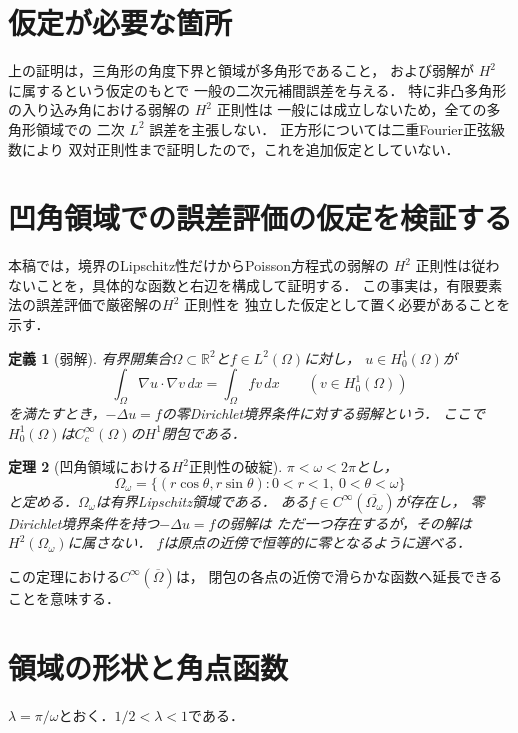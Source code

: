 \documentclass[a5paper,10pt,onecolumn]{jsarticle}
\theoremstyle{mathnotetheorem}
\newtheorem{theorem}{定理}[section]
\newtheorem{definition}[theorem]{定義}
\begin{document}
\section{仮定が必要な箇所}
上の証明は，三角形の角度下界と領域が多角形であること，
および弱解が $H^2$ に属するという仮定のもとで
一般の二次元補間誤差を与える．
特に非凸多角形の入り込み角における弱解の $H^2$ 正則性は
一般には成立しないため，全ての多角形領域での
二次 $L^2$ 誤差を主張しない．
正方形については二重Fourier正弦級数により
双対正則性まで証明したので，これを追加仮定としていない．


\section{凹角領域での誤差評価の仮定を検証する}
本稿では，境界のLipschitz性だけからPoisson方程式の弱解の
$H^2$ 正則性は従わないことを，具体的な函数と右辺を構成して証明する．
この事実は，有限要素法の誤差評価で厳密解の$H^2$ 正則性を
独立した仮定として置く必要があることを示す．

\begin{definition}[弱解]
有界開集合$\Omega\subset\mathbb R^2$と$f\in L^2(\Omega)$に対し，
$u\in H_0^1(\Omega)$が
\[
 \int_\Omega\nabla u\cdot\nabla v\,dx
   =\int_\Omega fv\,dx
 \qquad(v\in H_0^1(\Omega))
\]
を満たすとき，$-\Delta u=f$の零Dirichlet境界条件に対する弱解という．
ここで$H_0^1(\Omega)$は$C_c^\infty(\Omega)$の$H^1$閉包である．
\end{definition}

\begin{theorem}[凹角領域における$H^2$正則性の破綻]\label{corner:thm:corner}
$\pi<\omega<2\pi$とし，
\[
 \Omega_\omega=
 \{(r\cos\theta,r\sin\theta):0<r<1,\ 0<\theta<\omega\}
\]
と定める．$\Omega_\omega$は有界Lipschitz領域である．
ある$f\in C^\infty(\overline{\Omega_\omega})$が存在し，
零Dirichlet境界条件を持つ$-\Delta u=f$の弱解は
ただ一つ存在するが，その解は$H^2(\Omega_\omega)$に属さない．
$f$は原点の近傍で恒等的に零となるように選べる．
\end{theorem}

この定理における$C^\infty(\overline\Omega)$は，
閉包の各点の近傍で滑らかな函数へ延長できることを意味する．

\section{領域の形状と角点函数}
$\lambda=\pi/\omega$とおく．$1/2<\lambda<1$である．
\end{document}
